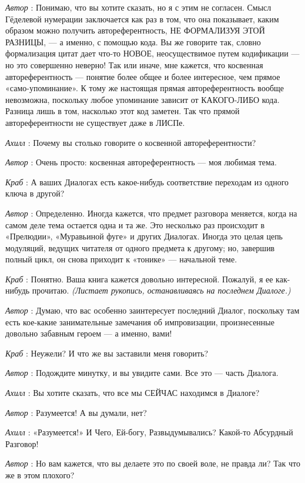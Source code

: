 \emph{Автор} : Понимаю, что вы хотите сказать, но я с этим не согласен. Смысл Гёделевой нумерации заключается как раз в том, что она показывает, каким образом можно получить автореферентность, НЕ ФОРМАЛИЗУЯ ЭТОЙ РАЗНИЦЫ, --- а именно, с помощью кода. Вы же говорите так, словно формализация цитат дает что-то НОВОЕ, неосуществимое путем кодификации --- но это совершенно неверно! Так или иначе, мне кажется, что косвенная автореферентность --- понятие более общее и более интересное, чем прямое «само-упоминание». К тому же настоящая прямая автореферентность вообще невозможна, поскольку любое упоминание зависит от КАКОГО-ЛИБО кода. Разница лишь в том, насколько этот код заметен. Так что прямой автореферентности не существует даже в ЛИСПе.

\emph{Ахилл} : Почему вы столько говорите о косвенной автореферентности?

\emph{Автор} : Очень просто: косвенная автореферентность --- моя любимая тема.

\emph{Краб} : А ваших Диалогах есть какое-нибудь соответствие переходам из одного ключа в другой?

\emph{Автор} : Определенно. Иногда кажется, что предмет разговора меняется, когда на самом деле тема остается одна и та же. Это несколько раз происходит в «Прелюдии», «Муравьиной фуге» и других Диалогах. Иногда это целая цепь модуляций, ведущих читателя от одного предмета к другому; но, завершив полный цикл, он снова приходит к «тонике» --- начальной теме.

\emph{Краб} : Понятно. Ваша книга кажется довольно интересной. Пожалуй, я ее как-нибудь прочитаю. \emph{(Листает рукопись, останавливаясь на последнем Диалоге.)}

\emph{Автор} : Думаю, что вас особенно заинтересует последний Диалог, поскольку там есть кое-какие занимательные замечания об импровизации, произнесенные довольно забавным героем --- а именно, вами!

\emph{Краб} : Неужели? И что же вы заставили меня говорить?

\emph{Автор} : Подождите минутку, и вы увидите сами. Все это --- часть Диалога.

\emph{Ахилл} : Вы хотите сказать, что все мы СЕЙЧАС находимся в Диалоге?

\emph{Автор} : Разумеется! А вы думали, нет?

\emph{Ахилл} : «Разумеется!» И Чего, Ей-богу, Развыдумывались? Какой-то Абсурдный Разговор!

\emph{Автор} : Но вам кажется, что вы делаете это по своей воле, не правда ли? Так что же в этом плохого?

